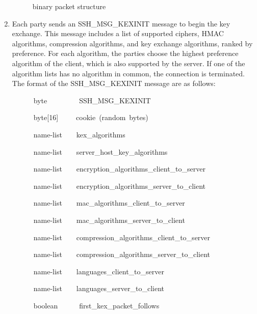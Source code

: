 \begin{enumerate}
\begin{figure}
\caption{\label{fig:ssh-packet} binary packet structure}

\end{figure}

\item Each party sends an SSH\_MSG\_KEXINIT message to begin the key exchange.
This message includes a list of supported ciphers, HMAC algorithms,
compression algorithms, and key exchange algorithms, ranked by preference.
For each algorithm, the parties choose the highest preference algorithm
of the client, which is also supported by the server. If one of the
algorithm lists has no algorithm in common, the connection is terminated.
The format of the SSH\_MSG\_KEXINIT message are as follows:

\begin{lyxcode}
~~~~~~byte~~~~~~~~~SSH\_MSG\_KEXINIT

~~~~~~byte{[}16{]}~~~~~cookie~(random~bytes)

~~~~~~name-list~~~~kex\_algorithms

~~~~~~name-list~~~~server\_host\_key\_algorithms

~~~~~~name-list~~~~encryption\_algorithms\_client\_to\_server

~~~~~~name-list~~~~encryption\_algorithms\_server\_to\_client

~~~~~~name-list~~~~mac\_algorithms\_client\_to\_server

~~~~~~name-list~~~~mac\_algorithms\_server\_to\_client

~~~~~~name-list~~~~compression\_algorithms\_client\_to\_server

~~~~~~name-list~~~~compression\_algorithms\_server\_to\_client

~~~~~~name-list~~~~languages\_client\_to\_server

~~~~~~name-list~~~~languages\_server\_to\_client

~~~~~~boolean~~~~~~first\_kex\_packet\_follows


\end{lyxcode}
\end{enumerate}

